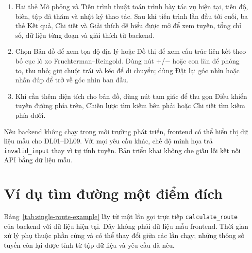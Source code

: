 \begin{enumerate}[itemsep=3pt]
  nới lỏng là cạnh đang được xét. Tuyến cuối chỉ dùng các mã trong
  \texttt{path\_edges}; đoạn cảnh báo được tô cam khi mức ùn tắc từ 4 trở lên
  hoặc rủi ro lớn hơn 0.
  \item Hai thẻ Mô phỏng và Tiến trình thuật toán trình bày tác vụ hiện tại, tiến
  độ, biên, tập đã thăm và nhật ký thao tác. Sau khi tiến trình lần đầu tới cuối, ba thẻ
  Kết quả, Chi tiết và Giải thích dễ hiểu được mở để xem tuyến, tổng chỉ
  số, dữ liệu từng đoạn và giải thích từ backend.
  \item Chọn Bản đồ để xem tọa độ địa lý hoặc Đồ thị để xem cấu trúc liên kết
  theo bố cục lò xo Fruchterman--Reingold. Dùng nút $+$/$-$ hoặc con lăn để phóng to, thu nhỏ; giữ chuột
  trái và kéo để di chuyển; dùng Đặt lại góc nhìn hoặc nhấn đúp để trở về góc nhìn ban đầu.
  \item Khi cần thêm diện tích cho bản đồ, dùng nút tam giác để thu gọn Điều
  khiển tuyến đường phía trên, Chiến lược tìm kiếm bên phải hoặc Chi tiết tìm kiếm phía dưới.
\end{enumerate}

Nếu backend không chạy trong môi trường phát triển, frontend có thể hiển thị dữ liệu
mẫu cho DL01--DL09. Với mọi yêu cầu khác, chế độ minh họa trả \texttt{invalid\_input}
thay vì tự tính tuyến. Bản triển khai không che giấu lỗi kết nối API bằng dữ liệu mẫu.

\section{Ví dụ tìm đường một điểm đích}

Bảng~\ref{tab:single-route-example} lấy từ một lần gọi trực tiếp
\texttt{calculate\_route} của backend với dữ liệu hiện tại. Đây không phải
dữ liệu mẫu frontend. Thời gian xử lý phụ thuộc phần cứng và có thể thay đổi giữa
các lần chạy; những thông số tuyến còn lại được tính từ tập dữ liệu và yêu cầu đã
nêu.

